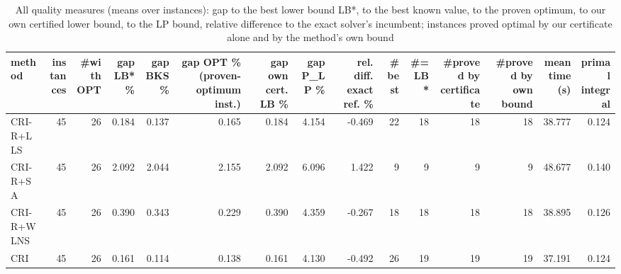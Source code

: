 \begin{table}[htbp]
\centering
\small
\caption{All quality measures (means over instances): gap to the best lower bound LB*, to the best known value, to the proven optimum, to our own certified lower bound, to the LP bound, relative difference to the exact solver's incumbent; instances proved optimal by our certificate alone and by the method's own bound}
\label{tab:E5b_ablation_60s_b60_all_metrics}
\begin{tabular}{lrrrrrrrrrrrrrr}
\toprule
method & instances & \#with OPT & gap LB* \% & gap BKS \% & gap OPT \% (proven-optimum inst.) & gap own cert. LB \% & gap P\_LP \% & rel. diff. exact ref. \% & \#best & \#= LB* & \#proved by certificate & \#proved by own bound & mean time (s) & primal integral \\
\midrule
CRI-R+LLS & 45 & 26 & 0.184 & 0.137 & 0.165 & 0.184 & 4.154 & -0.469 & 22 & 18 & 18 & 18 & 38.777 & 0.124 \\
CRI-R+SA & 45 & 26 & 2.092 & 2.044 & 2.155 & 2.092 & 6.096 & 1.422 & 9 & 9 & 9 & 9 & 48.677 & 0.140 \\
CRI-R+WLNS & 45 & 26 & 0.390 & 0.343 & 0.229 & 0.390 & 4.359 & -0.267 & 18 & 18 & 18 & 18 & 38.895 & 0.126 \\
CRI & 45 & 26 & 0.161 & 0.114 & 0.138 & 0.161 & 4.130 & -0.492 & 26 & 19 & 19 & 19 & 37.191 & 0.124 \\
\bottomrule
\end{tabular}
\end{table}
